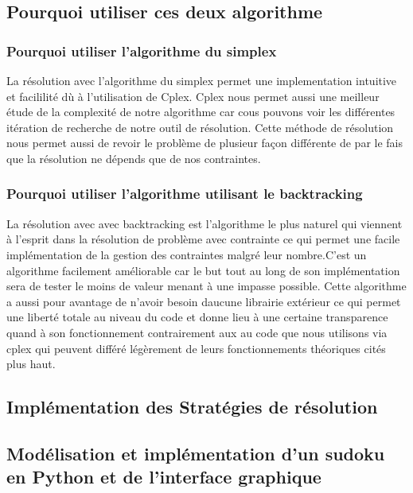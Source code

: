 \subsection{Pourquoi utiliser ces deux algorithme}

\subsubsection{Pourquoi utiliser l'algorithme du simplex}

La résolution avec l'algorithme du simplex permet une implementation intuitive et facililité dù à l'utilisation de Cplex. Cplex nous permet aussi une meilleur étude de la complexité de notre algorithme car cous pouvons voir les différentes itération de recherche de notre outil de résolution. Cette méthode de résolution nous permet aussi de revoir le problème de plusieur façon différente de par le fais que la résolution ne dépends que de nos contraintes.

\subsubsection{Pourquoi utiliser l'algorithme utilisant le backtracking}

La résolution avec avec backtracking est l'algorithme le plus naturel qui viennent à l'esprit dans la résolution de problème avec contrainte ce qui permet une facile implémentation de la gestion des contraintes malgré leur nombre.C'est un algorithme facilement améliorable car le but tout au long de son implémentation sera de tester le moins de valeur menant à une impasse possible. Cette algorithme a aussi pour avantage de n'avoir besoin daucune librairie extérieur ce qui permet une liberté totale au niveau du code et donne lieu à une certaine transparence quand à son fonctionnement contrairement aux au code que nous utilisons via cplex qui peuvent différé légèrement de leurs fonctionnements théoriques cités plus haut.\newpage

\subsection{Implémentation des Stratégies de résolution}

\subsection{Modélisation et implémentation d'un sudoku en Python et de l'interface graphique}

